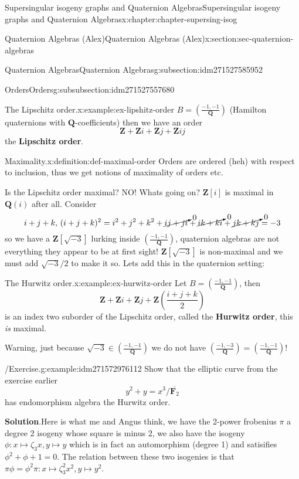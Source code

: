 \documentclass[oneside,10pt,]{book}
\newcommand{\terminology}[1]{\textbf{#1}}
\numberwithin{equation}{section}
\newcommand{\legendre}[2]{\left(\frac{#1}{#2}\right)}
\newcommand{\lb}{[}
\newcommand{\rb}{]}
\newcommand{\ZZ}{\mathbf{Z}}
\newcommand{\QQ}{\mathbf{Q}}
\newcommand{\FF}{\mathbf{F}}
\begin{document}
\begin{chapterptx}{Supersingular isogeny graphs and Quaternion Algebras}{}{Supersingular isogeny graphs and Quaternion Algebras}{}{}{x:chapter:chapter-supersing-isog}
\begin{sectionptx}{Quaternion Algebras (Alex)}{}{Quaternion Algebras (Alex)}{}{}{x:section:sec-quaternion-algebras}
\begin{subsectionptx}{Quaternion Algebras}{}{Quaternion Algebras}{}{}{g:subsection:idm271527585952}
\begin{subsubsectionptx}{Orders}{}{Orders}{}{}{g:subsubsection:idm271527557680}
\begin{example}{The Lipschitz order.}{x:example:ex-lipshitz-order}
\(B = \legendre{-1,-1}{\QQ}\) (Hamilton quaternions with \(\QQ\)-coefficients) then we have an order%
\begin{equation*}
\ZZ + \ZZ i + \ZZ j + \ZZ ij
\end{equation*}
the \terminology{Lipschitz order}.%
\end{example}
\begin{definition}{Maximality.}{x:definition:def-maximal-order}%
Orders are ordered (heh) with respect to inclusion, thus we get notions of maximality of orders etc.%
\end{definition}
Is the Lipschitz order maximal? NO! Whats going on? \(\ZZ\lb i\rb\) is maximal in \(\QQ(i)\) after all. Consider%
\begin{equation*}
i + j + k,\,(i+j + k)^2 = i^2 + j^2 + k^2 + \cancelto{0}{ij + ji} + \cancelto{0}{ik + ki} + \cancelto{0}{jk + kj} = -3
\end{equation*}
so we have a \(\ZZ\lb \sqrt{-3}\rb\) lurking inside \(\legendre{-1,-1}{\QQ}\), quaternion algebras are not everything they appear to be at first sight! \(\ZZ\lb \sqrt{-3}\rb\) is non-maximal and we must add \(\sqrt{-3}/2\) to make it so. Lets add this in the quaternion setting:%
\begin{example}{The Hurwitz order.}{x:example:ex-hurwitz-order}%
Let \(B = \legendre{-1,-1}{\QQ}\), then%
\begin{equation*}
\ZZ+  \ZZ i + \ZZ j + \ZZ \left(\frac{i + j + k}{2}\right)
\end{equation*}
is an index two suborder of the Lipschitz order, called the \terminology{Hurwitz order}, this \emph{is} maximal.%
\end{example}
Warning, just because \(\sqrt{-3} \in \legendre{-1,-1}{\QQ}\) we do not have \(\legendre{-1,-3}{\QQ} = \legendre{-1,-1}{\QQ}\)!%
\begin{example}{\slash{}Exercise.}{g:example:idm271572976112}%
Show that the elliptic curve from the exercise earlier%
\begin{equation*}
y^2 + y = x^3/\overline{\FF_2}
\end{equation*}
has endomorphism algebra the Hurwitz order.%
\par\smallskip%
\noindent\textbf{Solution}.\hypertarget{g:solution:idm271572962208}{}\quad{}Here is what me and Angus think, we have the 2-power frobenius \(\pi\) a degree 2 isogeny whose square is minus 2, we also have the isogeny \(\phi \colon x\mapsto \zeta_3 x, y\mapsto y\) which is in fact an automorphism (degree 1) and satisifies \(\phi^2 + \phi + 1 = 0\). The relation between these two isogenies is that \(\pi \phi  = \phi^2 \pi \colon x\mapsto \zeta_3^2 x^2, y\mapsto y^2\).%

\end{example}
\end{subsubsectionptx}
\end{subsectionptx}
\end{sectionptx}
\end{chapterptx}
\end{document}
